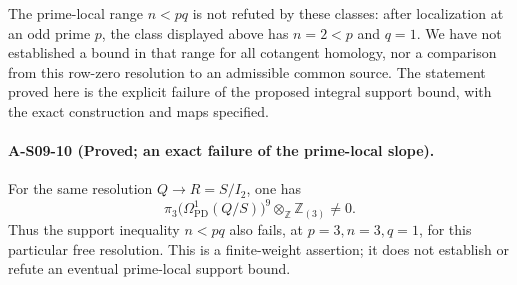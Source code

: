 The prime-local range $n<pq$ is not refuted by these classes:
after localization at an odd prime $p$, the class displayed above
has $n=2<p$ and $q=1$.  We have not established a bound in that
range for all cotangent homology, nor a comparison from this
row-zero resolution to an admissible common source.  The statement
proved here is the explicit failure of the proposed integral
support bound, with the exact construction and maps specified.

\paragraph{A-S09-10 (Proved; an exact failure of the prime-local slope).}
For the same resolution $Q\to R=S/I_2$, one has
\[
 \pi_3\bigl(\Omega^1_{\mathrm{PD}}(Q/S)\bigr)^9
       \otimes_{\mathbb Z}\mathbb Z_{(3)}\ne0.
\]
Thus the support inequality $n<pq$ also fails, at
$p=3,n=3,q=1$, for this particular free resolution.  This is a
finite-weight assertion; it does not establish or refute an
eventual prime-local support bound.

